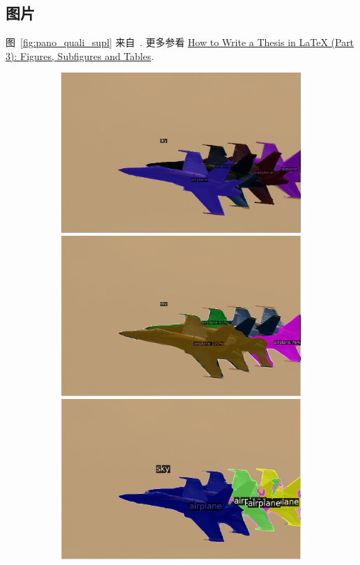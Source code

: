 \documentclass[11pt,a4paper,UTF8]{ctexart}
\begin{document}
\subsection{图片}
图~\ref{fig:pano_quali_supl} 来自~\cite{carion2020end}. 更多参看 \href{https://www.overleaf.com/learn/latex/How_to_Write_a_Thesis_in_LaTeX_(Part_3)%3A_Figures%2C_Subfigures_and_Tables#Subfigures}{How to Write a Thesis in LaTeX (Part 3): Figures, Subfigures and Tables}.
\begin{figure}[htp]
    \centering
     \begin{subfigure}[t]{\textwidth}
       \centering
       \includegraphics[width=.32\textwidth]{img/Panoptic/1113_gt.jpg}
       \includegraphics[width=.32\textwidth]{img/Panoptic/1113_panopticfpn.jpg}
       \includegraphics[width=.32\textwidth]{img/Panoptic/1113_detr_R101.jpg}
       

\end{subfigure}
\end{figure}
\end{document}
